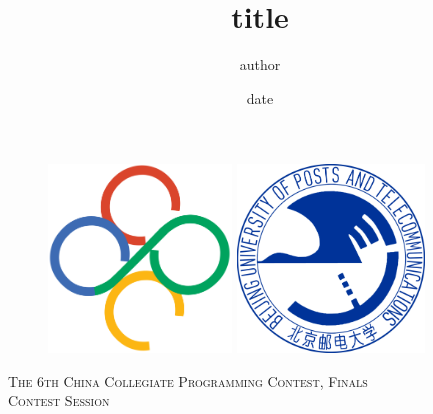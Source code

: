 \documentclass[12pt,a4paper]{ctexart}
\begin{document}
\title{title}
\author{author}
\date{date}

\begin{titlepage}
  \begin{figure}[H]
    \centering
    \begin{minipage}[t]{0.48\textwidth}
        \centering
        \includegraphics[height=5cm]{ccpc.png}
    \end{minipage}
    \begin{minipage}[t]{0.48\textwidth}
        \centering
        \includegraphics[height=5cm]{bupt.png}
    \end{minipage}
\end{figure}
    \begin{center}
        \textsc{\Large{The 6th China Collegiate Programming Contest, Finals\\}}
        \vspace{10mm}
        \fontsize{10mm}{7mm}\selectfont
        \textsc{Contest Session}\\
    \end{center}

    \vspace{10mm}


\end{titlepage}
\end{document}
